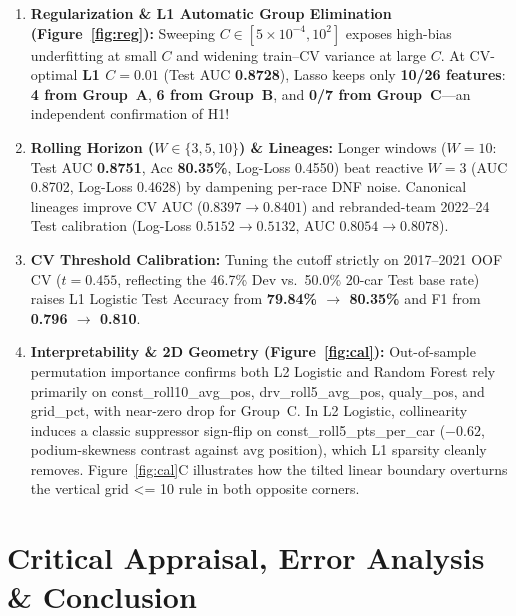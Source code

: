 \documentclass[10pt,a4paper,twocolumn]{article}
\newcommand{\code}[1]{{\fontsize{8.5pt}{10pt}\selectfont\ttfamily #1}}
\newcommand{\ub}{\_\allowbreak{}}
\begin{document}
\begin{enumerate}
  \item \textbf{Regularization \& L1 Automatic Group Elimination (Figure~\ref{fig:reg}):} Sweeping $C \in [5\times 10^{-4}, 10^2]$ exposes high-bias underfitting at small $C$ and widening train--CV variance at large $C$. At CV-optimal \textbf{L1 $C=0.01$} (Test AUC \textbf{0.8728}), Lasso keeps only \textbf{10/26 features}: \textbf{4 from Group~A}, \textbf{6 from Group~B}, and \textbf{0/7 from Group~C}---an independent confirmation of H1!
  \item \textbf{Rolling Horizon ($W \in \{3, 5, 10\}$) \& Lineages:} Longer windows ($W=10$: Test AUC \textbf{0.8751}, Acc \textbf{80.35\%}, Log-Loss 0.4550) beat reactive $W=3$ (AUC 0.8702, Log-Loss 0.4628) by dampening per-race DNF noise. Canonical lineages improve CV AUC ($0.8397 \rightarrow 0.8401$) and rebranded-team 2022--24 Test calibration (Log-Loss $0.5152 \rightarrow 0.5132$, AUC $0.8054 \rightarrow 0.8078$).
  \item \textbf{CV Threshold Calibration:} Tuning the cutoff strictly on 2017--2021 OOF CV ($t=0.455$, reflecting the 46.7\% Dev vs.\ 50.0\% 20-car Test base rate) raises L1 Logistic Test Accuracy from \textbf{79.84\% $\rightarrow$ 80.35\%} and F1 from \textbf{0.796 $\rightarrow$ 0.810}.
  \item \textbf{Interpretability \& 2D Geometry (Figure~\ref{fig:cal}):} Out-of-sample permutation importance confirms both L2 Logistic and Random Forest rely primarily on \code{const\ub roll10\ub avg\ub pos}, \code{drv\ub roll5\ub avg\ub pos}, \code{qualy\ub pos}, and \code{grid\ub pct}, with near-zero drop for Group~C. In L2 Logistic, collinearity induces a classic suppressor sign-flip on \code{const\ub roll5\ub pts\ub per\ub car} ($-0.62$, podium-skewness contrast against avg position), which L1 sparsity cleanly removes. Figure~\ref{fig:cal}C illustrates how the tilted linear boundary overturns the vertical \code{grid <= 10} rule in both opposite corners.
\end{enumerate}

\section{Critical Appraisal, Error Analysis \& Conclusion}
\end{document}

